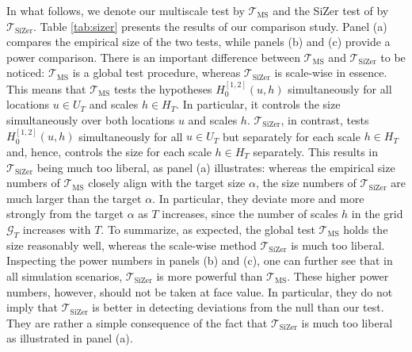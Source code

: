 \documentclass[12pt]{article}
\begin{document}
In what follows, we denote our multiscale test by $\mathcal{T}_{\text{MS}}$ and the SiZer test of \cite{Park2009} by $\mathcal{T}_{\text{SiZer}}$. Table \ref{tab:sizer} presents the results of our comparison study. Panel (a) compares the empirical size of the two tests, while panels (b) and (c) provide a power comparison. 
There is an important difference between $\mathcal{T}_{\text{MS}}$ and $\mathcal{T}_{\text{SiZer}}$ to be noticed: $\mathcal{T}_{\text{MS}}$ is a global test procedure, whereas $\mathcal{T}_{\text{SiZer}}$ is scale-wise in essence. This means that $\mathcal{T}_{\text{MS}}$ tests the hypotheses $H_0^{[1,2]}(u,h)$ simultaneously for all locations $u \in U_T$ and scales $h \in H_T$. In particular, it controls the size simultaneously over both locations $u$ and scales $h$. $\mathcal{T}_{\text{SiZer}}$, in contrast, tests $H_0^{[1,2]}(u,h)$ simultaneously for all $u \in U_T$ but separately for each scale $h \in H_T$ and, hence, controls the size for each scale $h \in H_T$ separately. This results in $\mathcal{T}_{\text{SiZer}}$ being much too liberal, as panel (a) illustrates: whereas the empirical size numbers of $\mathcal{T}_{\text{MS}}$ closely align with the target size $\alpha$, the size numbers of $\mathcal{T}_{\text{SiZer}}$ are much larger than the target $\alpha$. In particular, they deviate more and more strongly from the target $\alpha$ as $T$ increases, since the number of scales $h$ in the grid $\mathcal{G}_T$ increases with $T$. To summarize, as expected, the global test $\mathcal{T}_{\text{MS}}$ holds the size reasonably well, whereas the scale-wise method $\mathcal{T}_{\text{SiZer}}$ is much too liberal.
Inspecting the power numbers in panels (b) and (c), one can further see that in all simulation scenarios, $\mathcal{T}_{\text{SiZer}}$ is more powerful than $\mathcal{T}_{\text{MS}}$. These higher power numbers, however, should not be taken at face value. In particular, they do not imply that $\mathcal{T}_{\text{SiZer}}$ is better in detecting deviations from the null than our test. They are rather a simple consequence of the fact that $\mathcal{T}_{\text{SiZer}}$ is much too liberal as illustrated in panel (a).
\end{document}
